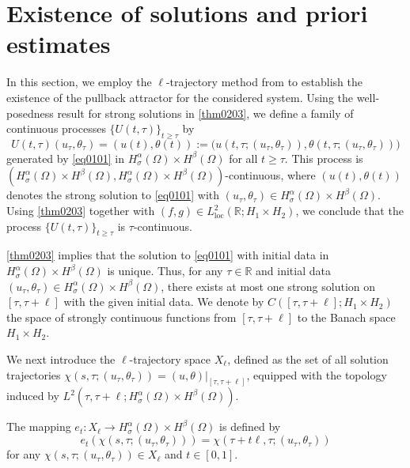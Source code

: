\documentclass[oneside,preprint,12pt,numbers,sort&compress]{elsarticle}
\begin{document}
\section{Existence of solutions and priori estimates}\label{sec03}
In this section, we employ the $\ell$-trajectory method from \cite{MN1996} to establish the existence of the pullback attractor for the considered system. Using the well-posedness result for strong solutions in \cref{thm0203}, we define a family of continuous processes $\{U(t, \tau)\}_{t\geq\tau}$ by
\[
U(t, \tau)(u_\tau, \theta_\tau) 
= (u(t), \theta(t)) 
:= \bigl(u(t, \tau; (u_\tau, \theta_\tau)), \theta(t, \tau; (u_\tau, \theta_\tau))\bigr)
\]
generated by \cref{eq0101} in $H_\sigma^\alpha(\Omega) \times H^{\beta}(\Omega)$ for all $t \geq \tau$. This process is $(H_\sigma^\alpha(\Omega)\times H^{\beta}(\Omega),H_\sigma^\alpha(\Omega)\times H^{\beta}(\Omega))$-continuous, where $(u(t), \theta(t))$ denotes the strong solution to \cref{eq0101} with $(u_\tau, \theta_\tau)\in H_\sigma^\alpha(\Omega)\times H^{\beta}(\Omega)$. Using \cref{thm0203} together with $(f, g) \in L^2_{\text{loc}}(\mathbb{R}; H_{1} \times H_{2})$, we conclude that the process $\{U(t, \tau)\}_{t\geq\tau}$ is $\tau$-continuous.

\cref{thm0203} implies that the solution to \eqref{eq0101} with initial data in \(H_\sigma^{\alpha}(\Omega) \times H^{\beta}(\Omega)\) is unique. Thus, for any \(\tau \in \mathbb{R}\) and initial data \((u_{\tau}, \theta_{\tau}) \in H_\sigma^{\alpha}(\Omega) \times H^{\beta}(\Omega)\), there exists at most one strong solution on \([\tau, \tau+\ell]\) with the given initial data. We denote by \(C([\tau, \tau+\ell]; H_{1} \times H_{2})\) the space of strongly continuous functions from \([\tau, \tau+\ell]\) to the Banach space \(H_{1} \times H_{2}\). 

We next introduce the $\ell$-trajectory space $X_\ell$, defined as the set of all solution trajectories $\chi(s,\tau; (u_\tau, \theta_\tau)) = (u, \theta)\big|_{[\tau, \tau + \ell]} $, equipped with the topology induced by $ L^2(\tau, \tau + \ell; H_\sigma^{\alpha}(\Omega) \times H^{\beta}(\Omega))$.

The mapping $e_{t}:X_{\ell}\to H_\sigma^{\alpha}(\Omega) \times H^{\beta}(\Omega)$ is defined by
\[
e_{t}(\chi(s,\tau;(u_{\tau},\theta_{\tau})))
=\chi(\tau+t\ell,\tau;(u_{\tau},\theta_{\tau}))
\]
for any $\chi(s,\tau;(u_{\tau},\theta_{\tau}))\in X_{\ell}$ and $t \in [0,1]$.
\end{document}
